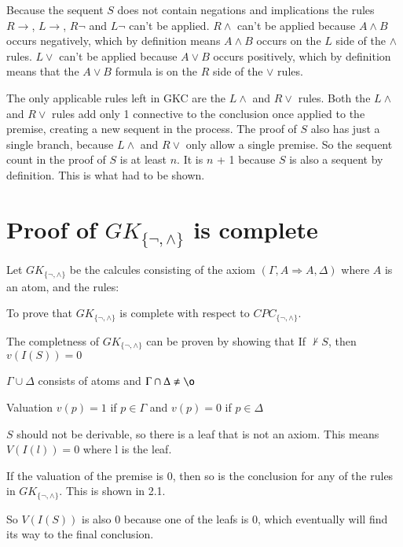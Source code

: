 \documentclass{article}
\begin{document}
Because the sequent $S$ does not contain negations and implications the rules
$R\to$, $L\to$, $R\neg$ and $L\neg$ can't be applied.
$R\wedge$ can't be applied because $A \wedge B$ occurs negatively,
which by definition means $A \wedge B$ occurs on the $L$ side of the
$\wedge$ rules.
$L\vee$ can't be
applied because $A \vee B$ occurs positively, which by definition means
that the $A \vee B$ formula is on the $R$ side of the $\vee$ rules.

The only applicable rules left in GKC are the $L\wedge$ and $R\vee$ rules.
Both the $L\wedge$ and $R\vee$ rules add only 1 connective to the conclusion
once applied to the premise, creating a new sequent in the process. The proof
of $S$ also has just a single branch, because $L\wedge$ and $R\vee$ only allow
a single premise.
So the
sequent count in the proof of $S$ is at least $n$. It is $n$ + 1 because $S$ is also
a sequent by definition. This is what had to be shown.
\section{Proof of $GK_{\{\neg, \wedge\}}$ is complete}
Let $GK_{\{\neg, \wedge\}}$ be the calcules consisting of the axiom
$(\Gamma, A \Rightarrow A, \Delta)$ where $A$ is an atom, and the rules:

\begin{prooftree}
\end{prooftree}
\begin{prooftree}
\end{prooftree}

\begin{prooftree}
\end{prooftree}

\begin{prooftree}
\end{prooftree}
To prove that $GK_{\{\neg, \wedge\}}$ is complete with respect to
$CPC_{\{\neg, \wedge\}}$.

The completness of $GK_{\{\neg, \wedge\}}$ can be proven by showing
that If $\nvdash S$, then $v(I(S)) = 0$

$\Gamma \cup \Delta$  consists of atoms and $\Gamma \cap \Delta \not= \o$

Valuation $v(p) = 1$  if $p \in \Gamma$ and $v(p) = 0$ if $p \in \Delta$

$S$ should not be derivable, so there is a leaf that is not an axiom.
This means $V(I(l)) = 0$ where l is the leaf.

If the valuation of the premise is 0, then so is the conclusion for any of
the rules in $GK_{\{\neg, \wedge\}}$. This is shown in 2.1.

So $V(I(S))$ is also 0 because one of the leafs is 0, which eventually
will find its way to the final conclusion.
\end{document}
